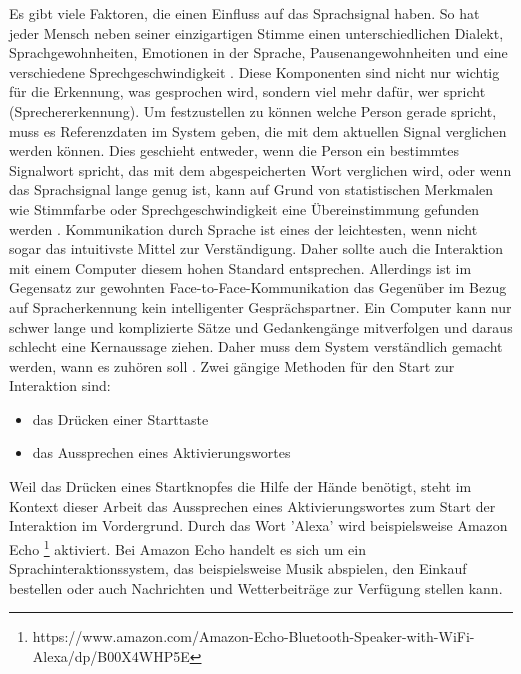 \newline \newline
Es gibt viele Faktoren, die einen Einfluss auf das Sprachsignal haben. So hat jeder Mensch neben seiner einzigartigen Stimme einen unterschiedlichen Dialekt, Sprachgewohnheiten, Emotionen in der Sprache, Pausenangewohnheiten und eine verschiedene Sprechgeschwindigkeit \cite{KaufmannPfisterSprache}. Diese Komponenten sind nicht nur wichtig für die Erkennung, was gesprochen wird, sondern viel mehr dafür, wer spricht (Sprechererkennung).
\newline \newline
Um festzustellen zu können welche Person gerade spricht, muss es Referenzdaten im System geben, die mit dem aktuellen Signal verglichen werden können. Dies geschieht entweder, wenn die Person ein bestimmtes Signalwort spricht, das mit dem abgespeicherten Wort verglichen wird, oder wenn das Sprachsignal lange genug ist, kann auf Grund von statistischen Merkmalen wie \zB Stimmfarbe oder Sprechgeschwindigkeit eine Übereinstimmung gefunden werden \cite{KaufmannPfisterSprache}. 
\newline \newline
Kommunikation durch Sprache ist eines der leichtesten, wenn nicht sogar das intuitivste Mittel zur Verständigung. Daher sollte auch die Interaktion mit einem Computer diesem hohen Standard entsprechen. Allerdings ist im Gegensatz zur gewohnten Face-to-Face-Kommunikation das Gegenüber im Bezug auf Spracherkennung kein intelligenter Gesprächspartner. Ein Computer kann nur schwer lange und komplizierte Sätze und Gedankengänge mitverfolgen und daraus schlecht eine Kernaussage ziehen. Daher muss dem System verständlich gemacht werden, wann es zuhören soll \cite{SpeechInteraction}.
Zwei gängige Methoden für den Start zur Interaktion sind:
\begin{itemize}
      \item das Drücken einer Starttaste
      \item das Aussprechen eines Aktivierungswortes
\end{itemize}
\vspace{\baselineskip}
Weil das Drücken eines Startknopfes die Hilfe der Hände benötigt, steht im Kontext dieser Arbeit das Aussprechen eines Aktivierungswortes zum Start der Interaktion im Vordergrund. Durch das Wort 'Alexa' wird beispielsweise Amazon Echo%
\footnote{https://www.amazon.com/Amazon-Echo-Bluetooth-Speaker-with-WiFi-Alexa/dp/B00X4WHP5E}
%
aktiviert. Bei Amazon Echo handelt es sich um ein Sprachinteraktionssystem, das beispielsweise Musik abspielen, den Einkauf bestellen oder auch Nachrichten und Wetterbeiträge zur Verfügung stellen kann.
